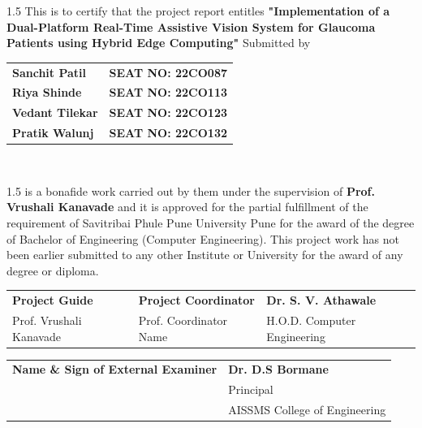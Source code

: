 \documentclass[12pt, a4paper]{report}
\begin{document}
\begin{spacing}{1.5}
This is to certify that the project report entitles \textbf{"Implementation of a Dual-Platform Real-Time Assistive Vision System for Glaucoma Patients using Hybrid Edge Computing"} Submitted by
\end{spacing}

\vspace{0.5cm}
\begin{center}
    \begin{tabular}{ll}
    \textbf{Sanchit Patil} & \textbf{SEAT NO: 22CO087} \\
    \textbf{Riya Shinde} & \textbf{SEAT NO: 22CO113} \\
    \textbf{Vedant Tilekar} & \textbf{SEAT NO: 22CO123} \\
    \textbf{Pratik Walunj} & \textbf{SEAT NO: 22CO132} \\
    \end{tabular} \\[1cm]
\end{center}
\vspace{0.5cm}

\begin{spacing}{1.5}
is a bonafide work carried out by them under the supervision of \textbf{Prof. Vrushali Kanavade} and it is approved for the partial fulfillment of the requirement of Savitribai Phule Pune University Pune for the award of the degree of Bachelor of Engineering (Computer Engineering). This project work has not been earlier submitted to any other Institute or University for the award of any degree or diploma.
\end{spacing}

\vspace{1.5cm}
\noindent
\begin{tabular}{@{}p{5cm} p{5cm} p{5cm}@{}}
    \textbf{Project Guide} & \textbf{Project Coordinator} & \textbf{Dr. S. V. Athawale} \\
    Prof. Vrushali Kanavade & Prof. Coordinator Name & H.O.D. \newline Computer Engineering
\end{tabular}

\vspace{2cm}
\noindent
\begin{tabular}{@{}p{7.5cm} p{7.5cm}@{}}
    \textbf{Name \& Sign of External Examiner} & \textbf{Dr. D.S Bormane} \\
    & Principal \\
    & AISSMS College of Engineering
\end{tabular}
\end{document}
